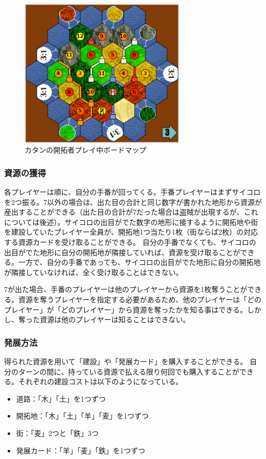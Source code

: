 \documentclass[a4, 10pt,dvipdfmx]{jsarticle}
\begin{document}
\begin{figure}[t]
    \begin{center}
      \includegraphics[width=80mm]{img/catan_board.png}
    \end{center}
    \caption{カタンの開拓者プレイ中ボードマップ~\cite{guhe2012trading}}
    \label{catan_board}
\end{figure}



\subsubsection*{資源の獲得}
各プレイヤーは順に、自分の手番が回ってくる。手番プレイヤーはまずサイコロを2つ振る。7以外の場合は、出た目の合計と同じ数字が書かれた地形から資源が産出することができる（出た目の合計が7だった場合は盗賊が出現するが、これについては後述）。サイコロの出目がでた数字の地形に接するように開拓地や街を建設していたプレイヤー全員が、開拓地1つ当たり1枚（街ならば2枚）の対応する資源カードを受け取ることができる。
自分の手番でなくても、サイコロの出目がでた地形に自分の開拓地が隣接していれば、資源を受け取ることができる。一方で、自分の手番であっても、サイコロの出目がでた地形に自分の開拓地が隣接していなければ、全く受け取ることはできない。

7が出た場合、手番のプレイヤーは他のプレイヤーから資源を1枚奪うことができる。資源を奪うプレイヤーを指定する必要があるため、他のプレイヤーは「どのプレイヤー」が「どのプレイヤー」から資源を奪ったかを知る事はできる。しかし、奪った資源は他のプレイヤーは知ることはできない。

\subsubsection*{発展方法}
得られた資源を用いて「建設」や「発展カード」を購入することができる。
自分のターンの間に、持っている資源で払える限り何回でも購入することができる。それぞれの建設コストは以下のようになっている。
\begin{itemize}
 \item 道路：「木」「土」を1つずつ
 \item 開拓地：「木」「土」「羊」「麦」を1つずつ
 \item 街：「麦」2つと「鉄」3つ
 \item 発展カード：「羊」「麦」「鉄」を1つずつ
\end{itemize}
\end{document}
